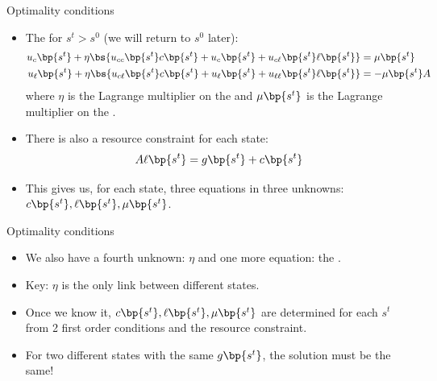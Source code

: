 \documentclass[11pt,xcolor={dvipsnames},hyperref={pdftex,pdfpagemode=UseNone,hidelinks,pdfdisplaydoctitle=true},usepdftitle=false]{beamer}
\begin{document}
    \begin{frame}{Optimality conditions}
    \begin{itemize}
    \item The  for $s^t > s^0$ (we will return to $s^0$ later):
    \begin{align*}
      u_c\bp{s^t} + \eta \bs{ u_{cc} \bp{s^t} c\bp{s^t} + u_c \bp{s^t} + u_{c\ell} \bp{s^t} \ell\bp{s^t} }  & =  \mu \bp{s^t} \\
      u_\ell\bp{s^t} +\eta \bs{ u_{c\ell} \bp{s^t} c\bp{s^t} + u_\ell \bp{s^t} + u_{\ell\ell} \bp{s^t} \ell\bp{s^t} }  & =  - \mu \bp{s^t} A
    \end{align*}
    where $\eta$ is the Lagrange multiplier on the  and $\mu\bp{s^t}$ is the Lagrange multiplier on the .
    \item There is also a resource constraint for each state: 
    \begin{align*}
        A \ell\bp{s^t} = g\bp{s^t} + c\bp{s^t}
    \end{align*}
    \item This gives us, for each state, three equations in three unknowns: $c\bp{s^t},\ell\bp{s^t},\mu\bp{s^t}$.
    \end{itemize}
    \end{frame}
    \begin{frame}{Optimality conditions}
        \begin{itemize}
        \item We also have a fourth unknown: $\eta$ and one more equation: the .
        \item Key: $\eta$ is the only link between different states.
        \item Once we know it, $c\bp{s^t},\ell\bp{s^t},\mu\bp{s^t}$ are determined for each $s^t$ from 2 first order conditions and the resource constraint.
        \item For two different states with the same $g\bp{s^t}$, the solution must be the same!
    \end{itemize}
        \end{frame}
\end{document}
